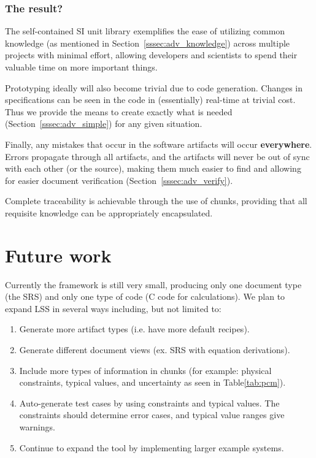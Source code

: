 \documentclass{sig-alternate-05-2015}
\newcommand{\lss}{LSS}
\begin{document}
%

\subsubsection{The result?} \label{sssec:ex_result}

The self-contained SI unit library exemplifies the ease of utilizing common
knowledge (as mentioned in Section~\ref{sssec:adv_knowledge}) across multiple
projects with minimal effort, allowing developers and scientists to spend their
valuable time on more important things.

Prototyping ideally will also become trivial due to code generation. Changes in
specifications can be seen in the code in (essentially) real-time at trivial
cost. Thus we provide the means to create exactly what is needed
(Section~\ref{sssec:adv_simple}) for any given situation.

Finally, any mistakes that occur in the software artifacts will occur
\textbf{everywhere}. Errors propagate through all artifacts, and the artifacts
will never be out of sync with each other (or the source), making them much
easier to find and allowing for easier document verification
(Section~\ref{sssec:adv_verify}).

Complete traceability is achievable through the use of chunks, providing that
all requisite knowledge can be appropriately encapsulated. 

\section{Future work} \label{sec:todo}

Currently the framework is still very small, producing only one document type
(the SRS) and only one type of code (C code for calculations). We plan to expand
\lss{} in several ways including, but not limited to:

\begin{enumerate}
\item Generate more artifact types (i.e. have more default recipes).
\item Generate different document views (ex. SRS with equation derivations).
\item Include more types of information in chunks (for example: physical
  constraints, typical values, and uncertainty as seen in Table\ref{tab:pcm}).
\item Auto-generate test cases by using constraints and typical values. The
  constraints should determine error cases, and typical value ranges give
  warnings.
\item Continue to expand the tool by implementing larger example systems.
\end{enumerate}
\end{document}
